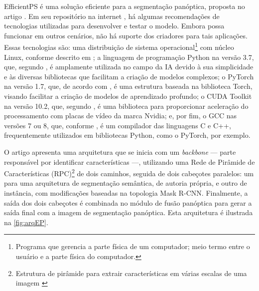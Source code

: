 \label{sec:EfficientPS}

EfficientPS é uma solução eficiente para a segmentação panóptica, proposta no artigo . Em seu repositório na internet , há algumas recomendações de tecnologias utilizadas para desenvolver e testar o modelo. Embora possa funcionar em outros cenários, não há suporte dos criadores para tais aplicações. Essas tecnologias são: uma distribuição de sistema operacional\footnote{Programa que gerencia a parte física de um computador; meio termo entre o usuário e a parte física do computador.} com núcleo Linux, conforme descrito em ; a linguagem de programação Python na versão 3.7, que, segundo , é amplamente utilizada no campo da IA devido à sua simplicidade e às diversas bibliotecas que facilitam a criação de modelos complexos; o PyTorch na versão 1.7, que, de acordo com , é uma estrutura baseada na biblioteca Torch, visando facilitar a criação de modelos de aprendizado profundo; o CUDA Toolkit na versão 10.2, que, segundo , é uma biblioteca para proporcionar aceleração do processamento com placas de vídeo da marca Nvidia; e, por fim, o GCC nas versões 7 ou 8, que, conforme , é um compilador das linguagens C e C++, frequentemente utilizados em bibliotecas Python, como o PyTorch, por exemplo.


O artigo apresenta uma arquitetura que se inicia com um \textit{backbone} — parte responsável por identificar características —, utilizando uma Rede de Pirâmide de Características (RPC)\footnote{Estrutura de pirâmide para extrair características em várias escalas de uma imagem \space\cite{piramide}} de dois caminhos, seguida de dois cabeçotes paralelos: um para uma arquitetura de segmentação semântica, de autoria própria, e outro de instância, com modificações baseadas na topologia Mask R-CNN. Finalmente, a saída dos dois cabeçotes é combinada no módulo de fusão panóptica para gerar a saída final com a imagem de segmentação panóptica. Esta arquitetura é ilustrada na \cref{fig:arqEP}.

